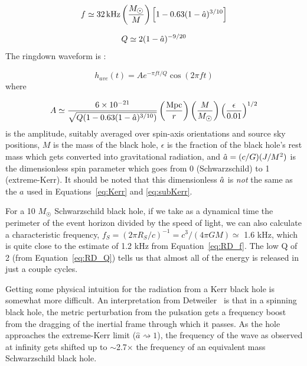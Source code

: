 \begin{equation}
f \simeq 32 \, \mbox{kHz} \left(\frac{M_{\astrosun}}{M}\right)
              \left[1 - 0.63 (1 - \Hat{a})^{3/10} \right]
\label{eq:RD_f}
\end{equation}

\begin{equation}
Q \simeq 2 (1 - \Hat{a})^{-9/20}
\label{eq:RD_Q}
\end{equation}
The ringdown waveform is \cite{Jolien:40m}:

\begin{equation}
h_{ave}(t) = A e^{-\pi f t / Q} \cos{(2 \pi f t)}
\label{eq:RD_h}
\end{equation}
where

\begin{equation}
A \simeq \frac{6 \times 10^{-21}}{\sqrt{Q (1 - 0.63 (1-\Hat{a})^{3/10})}}
         \left(\frac{\mbox{Mpc}}{r}\right) 
         \left(\frac{M}{M_{\astrosun}}\right)
         \left(\frac{\epsilon}{0.01}\right)^{1/2}
\label{eq:RD_A}
\end{equation}
is the amplitude, suitably averaged over spin-axis orientations and source
sky positions, $M$ is the mass of the black hole, $\epsilon$ is the fraction
of the black hole's rest mass which gets converted into gravitational radiation, and 
$\Hat{a} = (c/G) (J/M^2)$ is the
dimensionless spin parameter which goes from 0 (Schwarzschild) to 1 (extreme-Kerr).
It should be noted that this dimensionless $\Hat{a}$ is \emph{not} the same as the 
$a$ used in Equations~\ref{eq:Kerr} and \ref{eq:subKerr}.

For a 10 $M_{\astrosun}$ Schwarzschild black hole, if we take as a dynamical time 
the perimeter of the event horizon divided by the speed of light, we can also 
calculate a characteristic frequency, 
$f_{S} = (2 \pi R_{S}/c)^{-1} = c^3 / (4 \pi  G M) \simeq$ 1.6 kHz, which
is quite close to the estimate of 1.2 kHz from Equation~\ref{eq:RD_f}. The low
Q of 2  (from Equation~\ref{eq:RD_Q}) tells us that almost all of the energy is 
released in just a couple cycles.

Getting some physical intuition for the radiation from a Kerr black hole is
somewhat more difficult. An interpretation from Detweiler~\cite{Detweiler:Battelle}
is that in a spinning black hole, the metric perturbation from the pulsation
gets a frequency boost from the dragging of the inertial frame through which
it passes. As the hole approaches the extreme-Kerr limit 
($\hat{a} \rightsquigarrow 1$), the frequency of the wave as observed at infinity
gets shifted up to $\sim$2.7$\times$ the frequency of an equivalent mass
Schwarzschild black hole.


